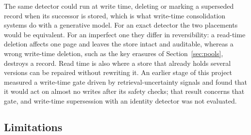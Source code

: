 \documentclass[11pt]{article}
\begin{document}
The same detector could run at write time, deleting or marking a superseded record when its successor is stored, which is what write-time consolidation systems do with a generative model. For an exact detector the two placements would be equivalent. For an imperfect one they differ in reversibility: a read-time deletion affects one page and leaves the store intact and auditable, whereas a wrong write-time deletion, such as the key erasures of Section~\ref{sec:pools}, destroys a record. Read time is also where a store that already holds several versions can be repaired without rewriting it. An earlier stage of this project measured a write-time gate driven by retrieval-uncertainty signals and found that it would act on almost no writes after its safety checks; that result concerns that gate, and write-time supersession with an identity detector was not evaluated.

\subsection{Limitations}
\label{sec:limitations}
\end{document}
